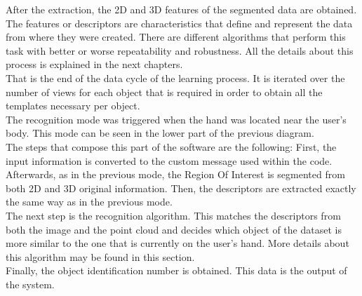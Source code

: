 After the extraction, the 2D and 3D features of the segmented data are obtained. The features or descriptors are characteristics that define and represent the data from where they were created. There are different algorithms that perform this task with better or worse repeatability and robustness. All the details about this process is explained in the next chapters. 
\\

That is the end of the data cycle of the learning process. It is iterated over the number of views for each object that is required in order to obtain all the templates necessary per object. 
\\

The recognition mode was triggered when the hand was located near the user's body. This mode can be seen in the lower part of the previous diagram. 
\\

The steps that compose this part of the software are the following: 
First, the input information is converted to the custom message used within the code. Afterwards, as in the previous mode, the Region Of Interest is segmented from both 2D and 3D original information. Then, the descriptors are extracted exactly the same way as in the previous mode. 
\\

The next step is the recognition algorithm. This matches the descriptors from both the image and the point cloud and decides which object of the dataset is more similar to the one that is currently on the user's hand. More details about this algorithm may be found in this section. 
\\

Finally, the object identification number is obtained. This data is the output of the system. 
